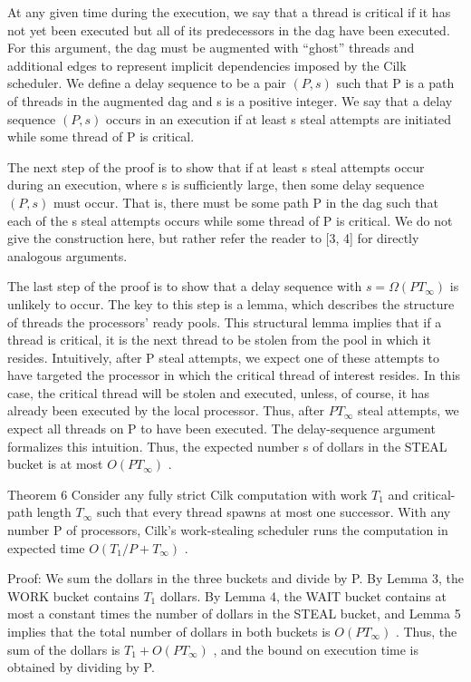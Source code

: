 \documentclass[
]{article}
\begin{document}
At any given time during the execution, we say that a thread is critical
if it has not yet been executed but all of its predecessors in the dag
have been executed. For this argument, the dag must be augmented with
``ghost'' threads and additional edges to represent implicit
dependencies imposed by the Cilk scheduler. We define a delay sequence
to be a pair \((P, s)\) such that P is a path of threads in the
augmented dag and s is a positive integer. We say that a delay sequence
\((P, s)\) occurs in an execution if at least s steal attempts are
initiated while some thread of P is critical.

The next step of the proof is to show that if at least s steal attempts
occur during an execution, where s is sufficiently large, then some
delay sequence \((P, s)\) must occur. That is, there must be some path P
in the dag such that each of the s steal attempts occurs while some
thread of P is critical. We do not give the construction here, but
rather refer the reader to {[}3, 4{]} for directly analogous arguments.

The last step of the proof is to show that a delay sequence with
\(s = \Omega(PT_{\infty})\) is unlikely to occur. The key to this step
is a lemma, which describes the structure of threads the processors'
ready pools. This structural lemma implies that if a thread is critical,
it is the next thread to be stolen from the pool in which it resides.
Intuitively, after P steal attempts, we expect one of these attempts to
have targeted the processor in which the critical thread of interest
resides. In this case, the critical thread will be stolen and executed,
unless, of course, it has already been executed by the local processor.
Thus, after \(PT_{\infty}\) steal attempts, we expect all threads on P
to have been executed. The delay-sequence argument formalizes this
intuition. Thus, the expected number s of dollars in the STEAL bucket is
at most \(O(PT_{\infty})\) .

Theorem 6 Consider any fully strict Cilk computation with work \(T_{1}\)
and critical-path length \(T_{\infty}\) such that every thread spawns at
most one successor. With any number P of processors, Cilk's
work-stealing scheduler runs the computation in expected time
\(O(T_{1}/P + T_{\infty})\) .

Proof: We sum the dollars in the three buckets and divide by P. By Lemma
3, the WORK bucket contains \(T_{1}\) dollars. By Lemma 4, the WAIT
bucket contains at most a constant times the number of dollars in the
STEAL bucket, and Lemma 5 implies that the total number of dollars in
both buckets is \(O(PT_{\infty})\) . Thus, the sum of the dollars is
\(T_{1} + O(PT_{\infty})\) , and the bound on execution time is obtained
by dividing by P.
\end{document}
